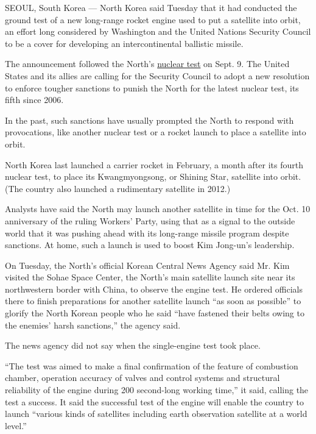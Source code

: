 SEOUL, South Korea --- North Korea said Tuesday that it had conducted
the ground test of a new long-range rocket engine used to put a
satellite into orbit, an effort long considered by Washington and the
United Nations Security Council to be a cover for developing an
intercontinental ballistic missile.

The announcement followed the North's
\href{http://www.nytimes3xbfgragh.onion/2016/09/09/world/asia/north-korea-nuclear-test.html}{nuclear
test} on Sept. 9. The United States and its allies are calling for the
Security Council to adopt a new resolution to enforce tougher sanctions
to punish the North for the latest nuclear test, its fifth since 2006.

In the past, such sanctions have usually prompted the North to respond
with provocations, like another nuclear test or a rocket launch to place
a satellite into orbit.

North Korea last launched a carrier rocket in February, a month after
its fourth nuclear test, to place its Kwangmyongsong, or Shining Star,
satellite into orbit. (The country also launched a rudimentary satellite
in 2012.)

Analysts have said the North may launch another satellite in time for
the Oct. 10 anniversary of the ruling Workers' Party, using that as a
signal to the outside world that it was pushing ahead with its
long-range missile program despite sanctions. At home, such a launch is
used to boost Kim Jong-un's leadership.

On Tuesday, the North's official Korean Central News Agency said Mr. Kim
visited the Sohae Space Center, the North's main satellite launch site
near its northwestern border with China, to observe the engine test. He
ordered officials there to finish preparations for another satellite
launch ``as soon as possible'' to glorify the North Korean people who he
said ``have fastened their belts owing to the enemies' harsh
sanctions,'' the agency said.

The news agency did not say when the single-engine test took place.

``The test was aimed to make a final confirmation of the feature of
combustion chamber, operation accuracy of valves and control systems and
structural reliability of the engine during 200 second-long working
time,'' it said, calling the test a success. It said the successful test
of the engine will enable the country to launch ``various kinds of
satellites including earth observation satellite at a world level.''

